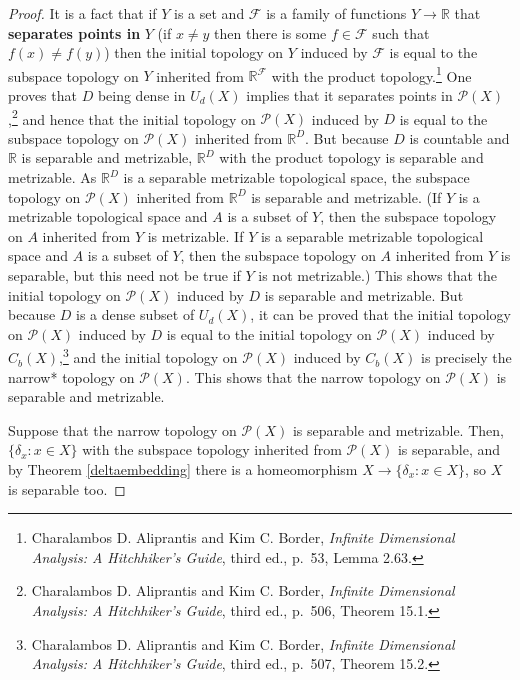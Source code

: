 \documentclass{article}
\theoremstyle{definition}
\begin{document}
\begin{proof}
It is a fact that if $Y$ is a set and $\mathscr{F}$ is a family of functions $Y \to \mathbb{R}$ that \textbf{separates points in} $Y$ (if
$x \neq y$ then there is some $f \in \mathscr{F}$ such that $f(x) \neq f(y)$) then 
the initial topology on $Y$ induced by $\mathscr{F}$ is equal to the subspace topology on $Y$ inherited from
$\mathbb{R}^{\mathscr{F}}$ with the product topology.\footnote{Charalambos D. 
Aliprantis and Kim C. Border, {\em Infinite Dimensional Analysis: A Hitchhiker's Guide}, third ed., p.~53, Lemma 2.63.}
One proves that  $D$ being dense in $U_d(X)$ implies that it separates points in $\mathscr{P}(X)$,\footnote{Charalambos D. 
Aliprantis and Kim C. Border, {\em Infinite Dimensional Analysis: A Hitchhiker's Guide}, third ed., p.~506, Theorem 15.1.}
and hence that the initial topology on $\mathscr{P}(X)$ induced by $D$ is equal to the subspace topology on $\mathscr{P}(X)$ inherited
from $\mathbb{R}^D$. But because $D$ is countable and $\mathbb{R}$ is separable and metrizable,  $\mathbb{R}^D$ with the product topology is 
separable and metrizable. 
As $\mathbb{R}^D$ is a separable
metrizable topological space, the subspace topology on $\mathscr{P}(X)$  inherited from $\mathbb{R}^D$ is separable and metrizable. (If $Y$ is a metrizable
topological space and $A$ is a subset of $Y$, then the subspace topology on $A$ inherited from $Y$ is metrizable. If $Y$ is a separable metrizable
topological space and $A$ is a subset of $Y$, then the subspace topology on $A$ inherited from $Y$ is separable, but this need not be true if $Y$ is not metrizable.)
This shows that the initial topology on $\mathscr{P}(X)$ induced by $D$ is separable and metrizable. But 
because $D$ is a dense subset of $U_d(X)$, it can be   proved that the initial topology on $\mathscr{P}(X)$ induced by $D$ is equal to the initial
topology  on $\mathscr{P}(X)$ induced by $C_b(X)$,\footnote{Charalambos D. 
Aliprantis and Kim C. Border, {\em Infinite Dimensional Analysis: A Hitchhiker's Guide}, third ed., p.~507, Theorem 15.2.} and the initial topology on $\mathscr{P}(X)$ induced
by $C_b(X)$ is precisely the narrow* topology on $\mathscr{P}(X)$. This shows that the narrow topology on $\mathscr{P}(X)$ is separable and metrizable.

Suppose that the narrow topology on $\mathscr{P}(X)$ is separable and metrizable. Then, $\{\delta_x: x \in X\}$ with the subspace topology inherited from
$\mathscr{P}(X)$ is separable, and by Theorem \ref{deltaembedding} there is a homeomorphism $X \to \{\delta_x: x \in X\}$, so $X$ is separable too. 
\end{proof}
\end{document}
